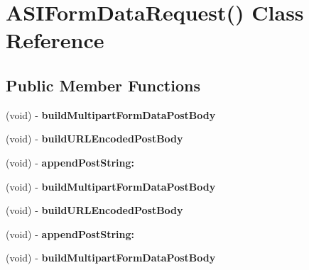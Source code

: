 \hypertarget{interface_a_s_i_form_data_request_07_08}{
\section{\-A\-S\-I\-Form\-Data\-Request() \-Class \-Reference}
\label{interface_a_s_i_form_data_request_07_08}
}
\subsection*{\-Public \-Member \-Functions}
\begin{DoxyCompactItemize}
\item 
\hypertarget{interface_a_s_i_form_data_request_07_08_a55154abc422c9c4497599337ebc1c932}{
(void) -\/ {\bfseries build\-Multipart\-Form\-Data\-Post\-Body}}
\label{interface_a_s_i_form_data_request_07_08_a55154abc422c9c4497599337ebc1c932}

\item 
\hypertarget{interface_a_s_i_form_data_request_07_08_a2927a87a8bfc64e29f5df6f0ea4792b7}{
(void) -\/ {\bfseries build\-U\-R\-L\-Encoded\-Post\-Body}}
\label{interface_a_s_i_form_data_request_07_08_a2927a87a8bfc64e29f5df6f0ea4792b7}

\item 
\hypertarget{interface_a_s_i_form_data_request_07_08_a1e91db0b76ca2a2129a597f65fae0c79}{
(void) -\/ {\bfseries append\-Post\-String\-:}}
\label{interface_a_s_i_form_data_request_07_08_a1e91db0b76ca2a2129a597f65fae0c79}

\item 
\hypertarget{interface_a_s_i_form_data_request_07_08_a55154abc422c9c4497599337ebc1c932}{
(void) -\/ {\bfseries build\-Multipart\-Form\-Data\-Post\-Body}}
\label{interface_a_s_i_form_data_request_07_08_a55154abc422c9c4497599337ebc1c932}

\item 
\hypertarget{interface_a_s_i_form_data_request_07_08_a2927a87a8bfc64e29f5df6f0ea4792b7}{
(void) -\/ {\bfseries build\-U\-R\-L\-Encoded\-Post\-Body}}
\label{interface_a_s_i_form_data_request_07_08_a2927a87a8bfc64e29f5df6f0ea4792b7}

\item 
\hypertarget{interface_a_s_i_form_data_request_07_08_a1e91db0b76ca2a2129a597f65fae0c79}{
(void) -\/ {\bfseries append\-Post\-String\-:}}
\label{interface_a_s_i_form_data_request_07_08_a1e91db0b76ca2a2129a597f65fae0c79}

\item 
\hypertarget{interface_a_s_i_form_data_request_07_08_a55154abc422c9c4497599337ebc1c932}{
(void) -\/ {\bfseries build\-Multipart\-Form\-Data\-Post\-Body}}
\label{interface_a_s_i_form_data_request_07_08_a55154abc422c9c4497599337ebc1c932}


\end{DoxyCompactItemize}
